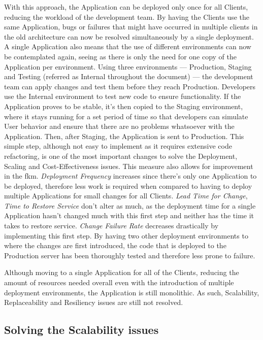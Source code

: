 

With this approach, the Application can be deployed only once for all Clients, reducing the workload of the development team. By having the Clients use the same Application, bugs or failures that might have occurred in multiple clients in the old architecture can now be resolved simultaneously by a single deployment. A single Application also means that the use of different environments can now be contemplated again, seeing as there is only the need for one copy of the Application per environment. Using three environments --- Production, Staging and Testing (referred as Internal throughout the document) --- the development team can apply changes and test them before they reach Production. Developers use the Internal environment to test new code to ensure functionality. If the Application proves to be stable, it's then copied to the Staging environment, where it stays running for a set period of time so that developers can simulate User behavior and ensure that there are no problems whatsoever with the Application. Then, after Staging, the Application is sent to Production.
This simple step, although not easy to implement as it requires extensive code refactoring, is one of the most important changes to solve the Deployment, Scaling and Cost-Effectiveness issues. This measure also allows for improvement in the \gls{fkm}. \textit{Deployment Frequency} increases since there's only one Application to be deployed, therefore less work is required when compared to having to deploy multiple Applications for small changes for all Clients. \textit{Lead Time for Change}, \textit{Time to Restore Service} don't alter as much, as the deployment time for a single Application hasn't changed much with this first step and neither has the time it takes to restore service. \textit{Change Failure Rate} decreases drastically by implementing this first step. By having two other deployment environments to where the changes are first introduced, the code that is deployed to the Production server has been thoroughly tested and therefore less prone to failure.

Although moving to a single Application for all of the Clients, reducing the amount of resources needed overall even with the introduction of multiple deployment environments, the Application is still monolithic. As such, Scalability, Replaceability and Resiliency issues are still not resolved.

\subsection{Solving the Scalability issues}\label{methodology:ss:solving-the-scalability-issues}

